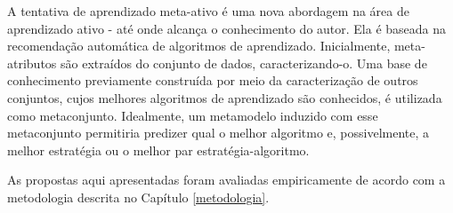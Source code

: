 A tentativa de aprendizado meta-ativo é uma nova abordagem na área de aprendizado ativo - até onde alcança o conhecimento do autor.
Ela é baseada na recomendação automática de algoritmos de aprendizado.
Inicialmente, meta-atributos são extraídos do conjunto de dados, caracterizando-o.
Uma base de conhecimento previamente construída por meio da caracterização de outros conjuntos, cujos melhores algoritmos de aprendizado são conhecidos, é utilizada como metaconjunto.
Idealmente, um metamodelo induzido com esse metaconjunto permitiria predizer qual o melhor  algoritmo e, possivelmente, a melhor estratégia ou o melhor par estratégia-algoritmo.

As propostas aqui apresentadas foram avaliadas empiricamente de acordo com a metodologia descrita no Capítulo \ref{metodologia}.

